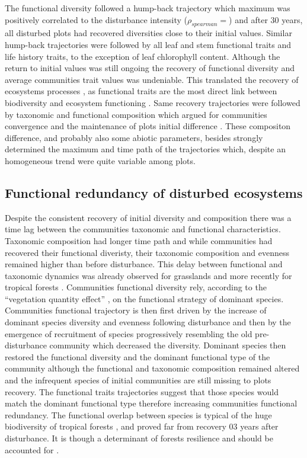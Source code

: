 \documentclass[fleqn,10pt]{ArtEcoFoG} %
\theoremstyle{definition}
\theoremstyle{definition}
\theoremstyle{definition}
\theoremstyle{remark}
\begin{document}
The functional diversity followed a hump-back trajectory which maximum
was positively correlated to the disturbance intensity
(\(\rho_{spearman}=\)) and after 30 years, all disturbed plots had
recovered diversities close to their initial values. Similar hump-back
trajectories were followed by all leaf and stem functional traits and
life history traits, to the exception of leaf chlorophyll content.
Although the return to initial values was still ongoing the recovery of
functional diversity and average communities trait values was
undeniable. This translated the recovery of ecosystems processes
\citep{Guariguata2001}, as functional traits are the most direct link
between biodiversity and ecosystem functioning \citep{Diaz2005}. Same
recovery trajectories were followed by taxonomic and functional
composition which argued for communities convergence and the maintenance
of plots initial difference
\citep{Hubbell1999, Molino2001, Baraloto2012a}. These compositon
difference, and probably also some abiotic parameters, besides strongly
determined the maximum and time path of the trajectories which, despite
an homogeneous trend were quite variable among plots.

\subsection{Functional redundancy of disturbed
ecosystems}\label{functional-redundancy-of-disturbed-ecosystems}

Despite the consistent recovery of initial diversity and composition
there was a time lag between the communities taxonomic and functional
characteristics. Taxonomic composition had longer time path and while
communities had recovered their functional diveristy, their taxonomic
composition and evenness remained higher than before disturbance. This
delay between functional and taxonomic dynamics was already observed for
grasslands \citep{Tilman1997, Mouillot2011} and more recently for
tropical forests \citep{Lohbeck2015, Guariguata2001}. Communities
functional diversity rely, according to the ``vegetation quantity
effect'' \citep{Grime1998}, on the functional strategy of dominant
species. Communities functional trajectory is then first driven by the
increase of dominant species diversity and evenness following
disturbance and then by the emergence of recruitment of species
progressively resembling the old pre-disturbance community which
decreased the diversity. Dominant species then restored the functional
diversity and the dominant functional type of the community although the
functional and taxonomic composition remained altered and the infrequent
species of initial communities are still missing to plots recovery. The
functional traits trajectories suggest that those species would match
the dominant functional type therefore increasing communities functional
redundancy. The functional overlap between species is typical of the
huge biodiversity of tropical forests \citep{Bellwood2006}, and proved
far from recovery 03 years after disturbance. It is though a determinant
of forests resilience and should be accounted for
\citep{Trenbath1999, Elmqvist2003, Diaz2005}.
\end{document}
